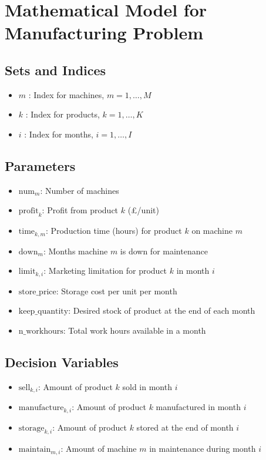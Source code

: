\documentclass{article}
\begin{document}
\section*{Mathematical Model for Manufacturing Problem}

\subsection*{Sets and Indices}
\begin{itemize}
    \item \( m \) : Index for machines, \( m = 1, \ldots, M \)
    \item \( k \) : Index for products, \( k = 1, \ldots, K \)
    \item \( i \) : Index for months, \( i = 1, \ldots, I \)
\end{itemize}

\subsection*{Parameters}
\begin{itemize}
    \item \( \text{num}_{m} \): Number of machines 
    \item \( \text{profit}_{k} \): Profit from product \( k \) (£/unit)
    \item \( \text{time}_{k, m} \): Production time (hours) for product \( k \) on machine \( m \)
    \item \( \text{down}_{m} \): Months machine \( m \) is down for maintenance
    \item \( \text{limit}_{k, i} \): Marketing limitation for product \( k \) in month \( i \)
    \item \( \text{store\_price} \): Storage cost per unit per month
    \item \( \text{keep\_quantity} \): Desired stock of product at the end of each month
    \item \( \text{n\_workhours} \): Total work hours available in a month
\end{itemize}

\subsection*{Decision Variables}
\begin{itemize}
    \item \( \text{sell}_{k, i} \): Amount of product \( k \) sold in month \( i \)
    \item \( \text{manufacture}_{k, i} \): Amount of product \( k \) manufactured in month \( i \)
    \item \( \text{storage}_{k, i} \): Amount of product \( k \) stored at the end of month \( i \)
    \item \( \text{maintain}_{m, i} \): Amount of machine \( m \) in maintenance during month \( i \)
\end{itemize}
\end{document}
